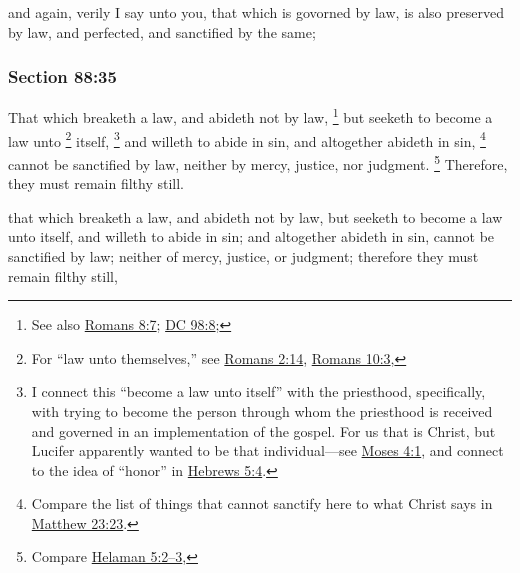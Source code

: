 		\begin{framed}
		\scriptsize
			\begin{compactdesc}
				\item[JSP] and again, verily I say unto you, that which is govorned by law, is also preserved by law, and perfected, and sanctified by the same;
			\end{compactdesc}
		\end{framed}

	\subsubsection{Section 88:35} %
		\label{DC88-35}

		That which breaketh a law, and abideth not by law,%
			\footnote{%
				See also \hyperref[ROMANS-8-7]{Romans 8:7}; \hyperref[DC98-8]{DC 98:8}; 
				}
		but seeketh to become a law unto%
			\footnote{%
				For ``law unto themselves,'' see \hyperref[ROMANS-2-14]{Romans 2:14}, \hyperref[ROMANS-10-3]{Romans 10:3}, 
				}
		itself,%
			\footnote{%
				I connect this ``become a law unto itself'' with the priesthood, specifically, with trying to become the person through whom the priesthood is received and governed in an implementation of the gospel. For us that is Christ, but Lucifer apparently wanted to be that individual---see \hyperref[MOSES-4-1]{Moses 4:1}, and connect to the idea of ``honor'' in \hyperref[HEBREWS-5-4]{Hebrews 5:4}.
				}
		and willeth to abide in sin, and altogether abideth in sin,
			\footnote{%
				Compare the list of things that cannot sanctify here to what Christ says in \hyperref[MATTHEW-23-23]{Matthew 23:23}.
				}%
		cannot be sanctified by law, neither by mercy, justice, nor judgment.%
			\footnote{%
				Compare \hyperref[HELAMAN-5-2]{Helaman 5:2--3}, 
				}
		Therefore, they must remain filthy still.

		\begin{framed}
		\scriptsize
			\begin{compactdesc}
				\item[JSP] that which breaketh a law, and abideth not by law, but seeketh to become a law unto itself, and willeth to abide in sin; and altogether abideth in sin, cannot be sanctified by law; neither of mercy, justice, or judgment; therefore they must remain filthy still,
			\end{compactdesc}
		\end{framed}

